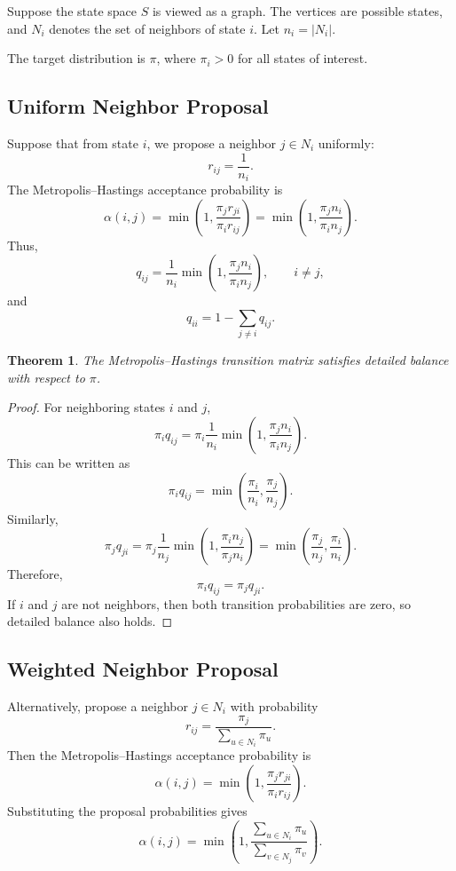\documentclass[12pt,oneside]{book}
\numberwithin{equation}{section}
\theoremstyle{definition}
\theoremstyle{plain}
\newtheorem{theorem}{Theorem}[section]
\theoremstyle{remark}
\begin{document}
Suppose the state space $S$ is viewed as a graph. The vertices are possible states, and $N_i$ denotes the set of neighbors of state $i$. Let $n_i=|N_i|$.

The target distribution is $\pi$, where $\pi_i>0$ for all states of interest.

\subsection{Uniform Neighbor Proposal}

Suppose that from state $i$, we propose a neighbor $j\in N_i$ uniformly:
\[
r_{ij}=\frac{1}{n_i}.
\]
The Metropolis--Hastings acceptance probability is
\[
\alpha(i,j)
=
\min\left(1,\frac{\pi_j r_{ji}}{\pi_i r_{ij}}\right)
=
\min\left(1,\frac{\pi_j n_i}{\pi_i n_j}\right).
\]
Thus,
\[
q_{ij}
=
\frac{1}{n_i}
\min\left(1,\frac{\pi_j n_i}{\pi_i n_j}\right),
\qquad i\neq j,
\]
and
\[
q_{ii}
=
1-\sum_{j\neq i}q_{ij}.
\]

\begin{theorem}
The Metropolis--Hastings transition matrix satisfies detailed balance with respect to $\pi$.
\end{theorem}

\begin{proof}
For neighboring states $i$ and $j$,
\[
\pi_i q_{ij}
=
\pi_i \frac{1}{n_i}
\min\left(1,\frac{\pi_j n_i}{\pi_i n_j}\right).
\]
This can be written as
\[
\pi_i q_{ij}
=
\min\left(\frac{\pi_i}{n_i},\frac{\pi_j}{n_j}\right).
\]
Similarly,
\[
\pi_j q_{ji}
=
\pi_j \frac{1}{n_j}
\min\left(1,\frac{\pi_i n_j}{\pi_j n_i}\right)
=
\min\left(\frac{\pi_j}{n_j},\frac{\pi_i}{n_i}\right).
\]
Therefore,
\[
\pi_i q_{ij}=\pi_j q_{ji}.
\]
If $i$ and $j$ are not neighbors, then both transition probabilities are zero, so detailed balance also holds.
\end{proof}

\subsection{Weighted Neighbor Proposal}

Alternatively, propose a neighbor $j\in N_i$ with probability
\[
r_{ij}
=
\frac{\pi_j}{\sum_{u\in N_i}\pi_u}.
\]
Then the Metropolis--Hastings acceptance probability is
\[
\alpha(i,j)
=
\min\left(
1,
\frac{\pi_j r_{ji}}{\pi_i r_{ij}}
\right).
\]
Substituting the proposal probabilities gives
\[
\alpha(i,j)
=
\min\left(
1,
\frac{\sum_{u\in N_i}\pi_u}{\sum_{v\in N_j}\pi_v}
\right).
\]
\end{document}

